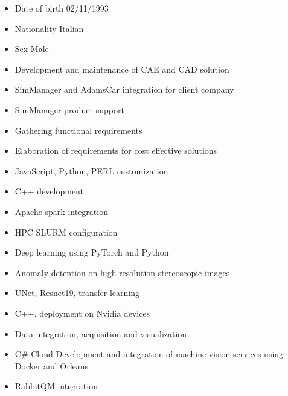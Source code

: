 \documentclass[10pt,a4paper,ragged2e,withhyper]{altacv}
\begin{document}
\begin{paracol}{2}

\begin{itemize}
\item Date of birth 02/11/1993
\item Nationality Italian
\item Sex Male
\end{itemize}


\begin{itemize}
\item Development and maintenance of CAE and CAD solution
\item SimManager and AdamsCar integration for client company
\item SimManager product support 
\item Gathering functional requirements
\item Elaboration of requirements for cost effective solutions
\item JavaScript, Python, PERL customization
\item C++ development
\item Apache spark integration
\item HPC SLURM configuration
\end{itemize}

\divider

\begin{itemize}
\item Deep learning using PyTorch and Python
\item Anomaly detention on high resolution stereoscopic images
\item UNet, Resnet19, transfer learning
\item C++, deployment on Nvidia devices
\item Data integration, acquisition and visualization
\item C\# Cloud Development and integration of machine vision services using Docker and Orleans
\item RabbitQM integration
\end{itemize}
\newpage
{}


\end{paracol}
\end{document}
